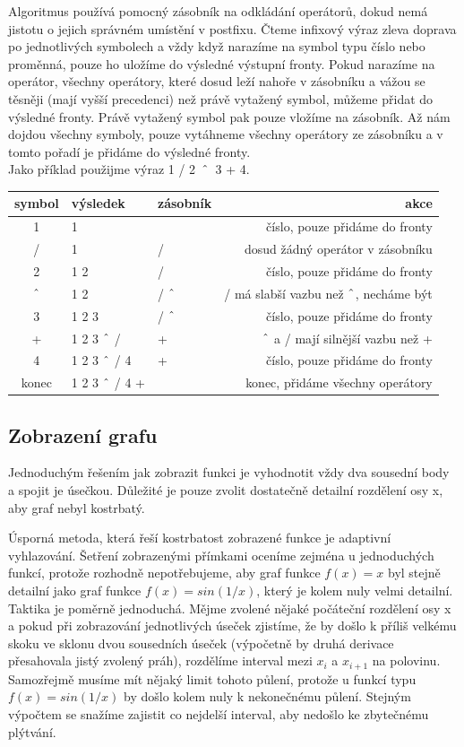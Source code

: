 \documentclass[11pt]{article}
\newcommand\CARET{\mathbin{\char`\^}}
\begin{document}
Algoritmus používá pomocný zásobník na odkládání operátorů, dokud nemá jistotu
o jejich správném umístění v postfixu. Čteme infixový výraz zleva doprava po
jednotlivých symbolech a vždy když narazíme na symbol typu číslo nebo proměnná,
pouze ho uložíme do výsledné výstupní fronty. Pokud narazíme na operátor,
všechny operátory, které dosud leží nahoře v zásobníku a vážou se těsněji (mají
vyšší precedenci) než právě vytažený symbol, můžeme přidat do výsledné fronty.
Právě vytažený symbol pak pouze vložíme na zásobník. Až nám dojdou všechny
symboly, pouze vytáhneme všechny operátory ze zásobníku a v tomto pořadí je
přidáme do výsledné fronty. \\

Jako příklad použijme výraz 1 / 2~$\CARET$~3 + 4.
\begin{center}
\begin{tabular}{|c|l|l|r|}
\hline
symbol & výsledek & zásobník & akce \\
\hline
1 & 1 & & číslo, pouze přidáme do fronty \\
/ & 1 & / & dosud žádný operátor v zásobníku\\
2 & 1 2 & / & číslo, pouze přidáme do fronty \\
$\CARET$ & 1 2 & / $\CARET$ & / má slabší vazbu než $\CARET$, necháme být \\
3 & 1 2 3 & / $\CARET$ & číslo, pouze přidáme do fronty \\
+ & 1 2 3 $\CARET$ / & + & $\CARET$ a / mají silnější vazbu než + \\
4 & 1 2 3 $\CARET$ / 4 & + & číslo, pouze přidáme do fronty \\
konec  & 1 2 3 $\CARET$ / 4 + & & konec, přidáme všechny operátory \\

\hline
\end{tabular}
\end{center}

\subsection{Zobrazení grafu}
Jednoduchým řešením jak zobrazit funkci je vyhodnotit vždy dva sousední body a
spojit je úsečkou. Důležité je pouze zvolit dostatečně detailní rozdělení osy
x, aby graf nebyl kostrbatý.

Úsporná metoda, která řeší kostrbatost zobrazené funkce je adaptivní
vyhlazování. Šetření zobrazenými přímkami oceníme zejména u jednoduchých
funkcí, protože rozhodně nepotřebujeme, aby graf funkce $f(x) = x$ byl stejně
detailní jako graf funkce $f(x) = sin(1/x)$, který je kolem nuly velmi
detailní. Taktika je poměrně jednoduchá. Mějme zvolené nějaké počáteční
rozdělení osy x a pokud při zobrazování jednotlivých úseček zjistíme, že by
došlo k příliš velkému skoku ve sklonu dvou sousedních úseček (výpočetně by
druhá derivace přesahovala jistý zvolený práh), rozdělíme interval mezi $x_i$
a $x_{i + 1}$ na polovinu. Samozřejmě musíme mít nějaký limit tohoto půlení,
protože u funkcí typu $f(x) = sin(1/x)$ by došlo kolem nuly k nekonečnému
půlení. Stejným výpočtem se snažíme zajistit co nejdelší interval, aby nedošlo
ke zbytečnému plýtvání. 
\end{document}
